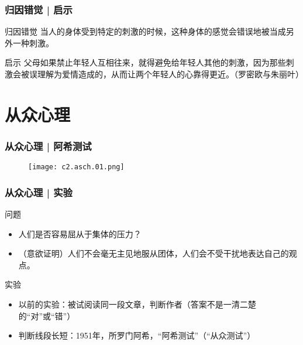 \begin{frame}
  \frametitle{归因错觉 | 启示}
  \begin{block}{归因错觉}
    当人的身体受到特定的刺激的时候，这种身体的感觉会错误地被当成另外一种刺激。
  \end{block}
  \pause
  \begin{block}{启示}
父母如果禁止年轻人互相往来，就得避免给年轻人其他的刺激，因为那些刺激会被误理解为爱情造成的，从而让两个年轻人的心靠得更近。（罗密欧与朱丽叶）
  \end{block}
\end{frame}

\section{从众心理}
\begin{frame}
  \frametitle{从众心理 | 阿希测试}
  \begin{figure}
    \centering
    \texttt{[image: c2.asch.01.png]}
  \end{figure}
\end{frame}

\begin{frame}
  \frametitle{从众心理 | 实验}
  \begin{block}{问题}
    \begin{itemize}
      \item 人们是否容易屈从于集体的压力？
      \item （意欲证明）人们不会毫无主见地服从团体，人们会不受干扰地表达自己的观点。
    \end{itemize}
  \end{block}
  \pause
  \begin{block}{实验}
    \begin{itemize}
      \item 以前的实验：被试阅读同一段文章，判断作者（答案不是一清二楚的“对”或“错”）
      \item 判断线段长短：1951年，所罗门\textbullet 阿希，“阿希测试”（“从众测试”）
    \end{itemize}
  \end{block}
\end{frame}

